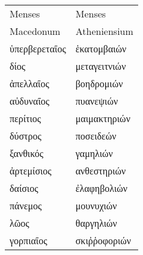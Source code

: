 %
\begin{tabular}{ l  l }
Menses                    & Menses\\
Macedonum                 & Atheniensium \\
\hline
\textgreek{ὑπερβερεταῖος}  &\textgreek{ἑκατομβαιών} \\
\textgreek{δίος}           &\textgreek{μεταγειτνιών} \\
\textgreek{ἀπελλαῖος}      &\textgreek{βοηδρομιών} \\
%
\textgreek{αὐδυναῖος}      &\textgreek{πυανεψιών} \\
\textgreek{περίτιος}        &\textgreek{μαιμακτηριών} \\
\textgreek{δύστρος}        &\textgreek{ποσειδεών} \\
%
\textgreek{ξανθικός}       &\textgreek{γαμηλιών} \\
\textgreek{ἀρτεμίσιος}     &\textgreek{ανθεστηριών} \\
\textgreek{δαίσιος}        &\textgreek{ἐλαφηβολιών} \\
%
\textgreek{πάνεμος}        &\textgreek{μουνυχιών} \\
\textgreek{λῶος}          &\textgreek{θαργηλιών} \\
\textgreek{γορπιαῖος}      &\textgreek{σκιῤῥοφοριών} \\
\end{tabular}
%
